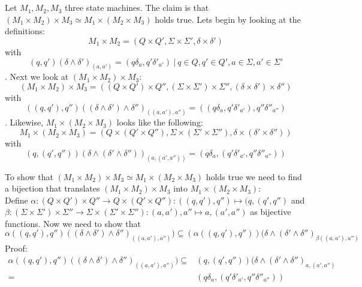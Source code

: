 \documentclass[a4paper,12pt,numbers=noenddot]{scrreport}
\begin{document}
\section{}
Let $M_1, M_2, M_3$ three state machines. The claim is that $(M_1 \times M_2) \times M_3 \simeq M_1 \times (M_2 \times M_3)$ holds true. 
Lets begin by looking at the definitions:\\
\begin{equation}
    M_1 \times M_2 = (Q \times Q', \Sigma \times \Sigma', \delta \times \delta')
\end{equation}
with 
\begin{equation}
    (q, q')(\delta \land \delta')_{(a, a')} = (q\delta_a, q'\delta'_{a'}) ~|~ q \in Q, q' \in Q', a \in \Sigma, a' \in \Sigma' 
\end{equation}
. Next we look at $(M_1 \times M_2) \times M_3$:\\
\begin{equation}
    (M_1 \times M_2) \times M_3 = ((Q \times Q')\times Q'', (\Sigma \times \Sigma') \times \Sigma'', (\delta \times \delta') \times \delta'') 
\end{equation}
with 
\begin{equation}
    ((q, q'), q'')((\delta \land \delta')\land \delta'')_{((a, a'), a'')} = ((q\delta_a, q'\delta'_{a'}), q''\delta''_{a''} )
\end{equation}
. Likewise, $M_1 \times (M_2 \times M_3)$ looks like the following:
\begin{equation}
    M_1 \times (M_2 \times M_3) = (Q \times (Q' \times Q''), \Sigma \times (\Sigma' \times \Sigma''), \delta \times (\delta' \times \delta''))
\end{equation}
with 
\begin{equation}
    (q, (q', q''))(\delta \land (\delta' \land \delta''))_{(a, (a' , a''))} = (q\delta_a, (q'\delta'_{a'} , q''\delta''_{a''}))
\end{equation}

To show that $(M_1 \times M_2) \times M_3 \simeq M_1 \times (M_2 \times M_3)$ holds true we need to find a bijection that translates $(M_1 \times M_2) \times M_3$ into $M_1 \times (M_2 \times M_3)$:\\
Define $\alpha: (Q\times Q') \times Q'' \rightarrow Q \times (Q' \times Q'') : ((q, q'), q'') \mapsto (q, (q', q'')$ and $\beta : (\Sigma \times \Sigma') \times \Sigma'' \rightarrow \Sigma \times (\Sigma' \times \Sigma'') : (a, a'), a'' \mapsto a, (a', a'')$ as bijective functions.
Now we need to show that 
\begin{equation}
    \alpha((q,q'),q'')((\delta \land \delta') \land \delta'')_{((a, a'), a'')}) \subseteq (\alpha((q,q'),q''))(\delta \land (\delta' \land \delta'')_{\beta((a, a'), a'')}
\end{equation}
Proof:\\
\begin{align*}
    \alpha((q,q'),q'')((\delta \land \delta') \land \delta'')_{((a, a'), a'')}) \subseteq & (q, (q', q''))(\delta \land (\delta' \land \delta'')_{a, (a', a'')}\\
                    = & (q\delta_a, (q'\delta'_{a'} , q''\delta''_{a''}))
\end{align*}
\end{document}
